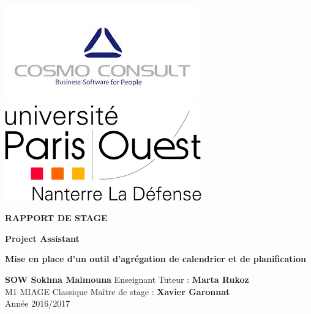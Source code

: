 \documentclass[11pt]{report}
\author{SOW Sokhna Maimouna} %
\begin{document}

\begin{titlepage}
\includegraphics[scale=0.5]{images/image1.jpg} 
\includegraphics[scale=0.3]{images/image2.png}

\hrulefill
\begin{center}\bfseries\huge
     RAPPORT DE STAGE
\end{center}

\begin{center}\bfseries\Huge
	Project Assistant
\end{center}

\begin{center}\bfseries\huge
Mise en place d'un outil d'agrégation de calendrier et de planification
\end{center}
\hrulefill

\vspace*{4cm}
\textbf{SOW Sokhna Maimouna}  
Enseignant Tuteur : \textbf{Marta Rukoz} \\
M1 MIAGE Classique 
Maître de stage : \textbf{Xavier Garonnat} \\
Année 2016/2017 \\ 
 
\end{titlepage}

\thispagestyle{empty}
\newpage
~
\end{document}
